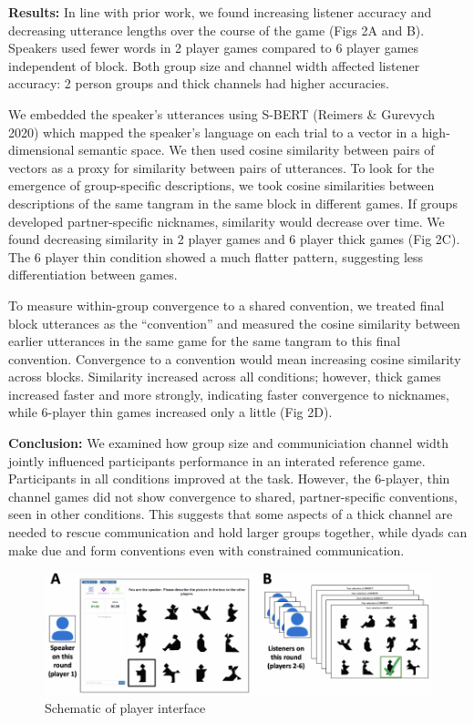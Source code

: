 \documentclass[11pt,a4paper]{article}
\begin{document}

\textbf{Results:} In line with prior work, we found increasing listener accuracy and decreasing utterance lengths over the course of the game (Figs 2A and B). Speakers used fewer words in 2 player games compared to 6 player games independent of block. Both group size and channel width affected listener accuracy: 2 person groups and thick channels had higher accuracies. 

We embedded the speaker's utterances using S-BERT (Reimers \& Gurevych 2020) which mapped the speaker's language on each trial to a vector in a high-dimensional semantic space. We then used cosine similarity between pairs of vectors as a proxy for similarity between pairs of utterances. To look for the emergence of group-specific descriptions, we took cosine similarities between descriptions of the same tangram in the same block in different games. If groups developed partner-specific nicknames, similarity would decrease over time. We found decreasing similarity in 2 player games and 6 player thick games (Fig 2C). The 6 player thin condition showed a much flatter pattern, suggesting less differentiation between games. 

To measure within-group convergence to a shared convention, we treated final block utterances as the ``convention'' and measured the cosine similarity between earlier utterances in the same game for the same tangram to this final convention. Convergence to a convention would mean increasing cosine similarity across blocks. Similarity increased across all conditions; however, thick games increased faster and more strongly, indicating faster convergence to nicknames, while 6-player thin games increased only a little (Fig 2D). 

\textbf{Conclusion:} We examined how group size and communiciation channel width jointly influenced participants performance in an interated reference game. Participants in all conditions improved at the task. However, the 6-player, thin channel games did not show convergence to shared, partner-specific conventions, seen in other conditions. This suggests that some aspects of a thick channel are needed to rescue communication and hold larger groups together, while dyads can make due and form conventions even with constrained communication. 

\newpage

\begin{figure}
	\includegraphics[width=\textwidth]{../images/interface-1.pdf}
	\caption{Schematic of player interface}
\end{figure}
\end{document}
